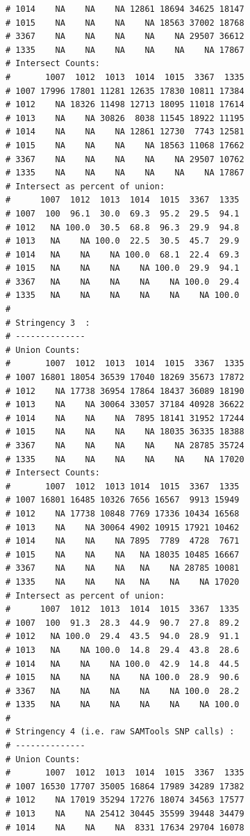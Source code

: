 \documentclass{article}\usepackage[]{graphicx}\usepackage[]{color}
\makeatletter
\newenvironment{kframe}{%
 \def\at@end@of@kframe{}%
 \ifinner\ifhmode%
  \def\at@end@of@kframe{\end{minipage}}%
  \begin{minipage}{\columnwidth}%
 \fi\fi%
 \def\FrameCommand##1{\hskip\@totalleftmargin \hskip-\fboxsep
 \colorbox{shadecolor}{##1}\hskip-\fboxsep
     \hskip-\linewidth \hskip-\@totalleftmargin \hskip\columnwidth}%
 \MakeFramed {\advance\hsize-\width
   \@totalleftmargin\z@ \linewidth\hsize
   \@setminipage}}%
 {\par\unskip\endMakeFramed%
 \at@end@of@kframe}
\newenvironment{knitrout}{}{} %
\makeatother
\begin{document}
\begin{knitrout}
\begin{kframe}
\begin{verbatim}
# 1014    NA    NA    NA 12861 18694 34625 18147
# 1015    NA    NA    NA    NA 18563 37002 18768
# 3367    NA    NA    NA    NA    NA 29507 36612
# 1335    NA    NA    NA    NA    NA    NA 17867
# Intersect Counts:
#       1007  1012  1013  1014  1015  3367  1335
# 1007 17996 17801 11281 12635 17830 10811 17384
# 1012    NA 18326 11498 12713 18095 11018 17614
# 1013    NA    NA 30826  8038 11545 18922 11195
# 1014    NA    NA    NA 12861 12730  7743 12581
# 1015    NA    NA    NA    NA 18563 11068 17662
# 3367    NA    NA    NA    NA    NA 29507 10762
# 1335    NA    NA    NA    NA    NA    NA 17867
# Intersect as percent of union:
#      1007  1012  1013  1014  1015  3367  1335
# 1007  100  96.1  30.0  69.3  95.2  29.5  94.1
# 1012   NA 100.0  30.5  68.8  96.3  29.9  94.8
# 1013   NA    NA 100.0  22.5  30.5  45.7  29.9
# 1014   NA    NA    NA 100.0  68.1  22.4  69.3
# 1015   NA    NA    NA    NA 100.0  29.9  94.1
# 3367   NA    NA    NA    NA    NA 100.0  29.4
# 1335   NA    NA    NA    NA    NA    NA 100.0
# 
# Stringency 3  :
# --------------
# Union Counts:
#       1007  1012  1013  1014  1015  3367  1335
# 1007 16801 18054 36539 17040 18269 35673 17872
# 1012    NA 17738 36954 17864 18437 36089 18190
# 1013    NA    NA 30064 33057 37184 40928 36622
# 1014    NA    NA    NA  7895 18141 31952 17244
# 1015    NA    NA    NA    NA 18035 36335 18388
# 3367    NA    NA    NA    NA    NA 28785 35724
# 1335    NA    NA    NA    NA    NA    NA 17020
# Intersect Counts:
#       1007  1012  1013 1014  1015  3367  1335
# 1007 16801 16485 10326 7656 16567  9913 15949
# 1012    NA 17738 10848 7769 17336 10434 16568
# 1013    NA    NA 30064 4902 10915 17921 10462
# 1014    NA    NA    NA 7895  7789  4728  7671
# 1015    NA    NA    NA   NA 18035 10485 16667
# 3367    NA    NA    NA   NA    NA 28785 10081
# 1335    NA    NA    NA   NA    NA    NA 17020
# Intersect as percent of union:
#      1007  1012  1013  1014  1015  3367  1335
# 1007  100  91.3  28.3  44.9  90.7  27.8  89.2
# 1012   NA 100.0  29.4  43.5  94.0  28.9  91.1
# 1013   NA    NA 100.0  14.8  29.4  43.8  28.6
# 1014   NA    NA    NA 100.0  42.9  14.8  44.5
# 1015   NA    NA    NA    NA 100.0  28.9  90.6
# 3367   NA    NA    NA    NA    NA 100.0  28.2
# 1335   NA    NA    NA    NA    NA    NA 100.0
# 
# Stringency 4 (i.e. raw SAMTools SNP calls) :
# --------------
# Union Counts:
#       1007  1012  1013  1014  1015  3367  1335
# 1007 16530 17707 35005 16864 17989 34289 17382
# 1012    NA 17019 35294 17276 18074 34563 17577
# 1013    NA    NA 25412 30445 35599 39448 34479
# 1014    NA    NA    NA  8331 17634 29704 16078

\end{verbatim}
\end{kframe}
\end{knitrout}
\end{document}
